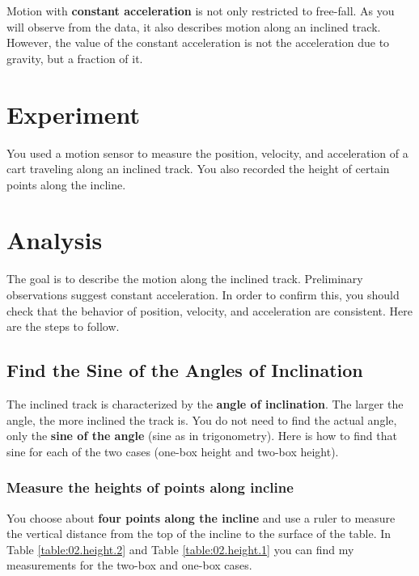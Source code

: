 Motion with \textbf{constant acceleration} is not only restricted to free-fall. As you will observe from the data, it also describes motion along an inclined track. However, the value of the constant acceleration is not the acceleration due to gravity, but a fraction of it.
%
\section{Experiment}
%
You used a motion sensor to measure the position, velocity, and acceleration of a cart traveling along an inclined track. You also recorded the height of certain points along the incline.
%
\section{Analysis}
%
The goal is to describe the motion along the inclined track. Preliminary observations suggest constant acceleration. In order to confirm this, you should check that the behavior of position, velocity, and acceleration are consistent. Here are the steps to follow.
%
\subsection{Find the Sine of the Angles of Inclination}
%
The inclined track is characterized by the \textbf{angle of inclination}. The larger the angle, the more inclined the track is. You do not need to find the actual angle, only the \textbf{sine of the angle} (sine as in trigonometry). Here is how to find that sine for each of the two cases (one-box height and two-box height).
%
\subsubsection{Measure the heights of points along incline}
%
You choose about \textbf{four points along the incline} and use a ruler to measure the vertical distance from the top of the incline to the surface of the table. In Table \ref{table:02.height.2} and Table \ref{table:02.height.1} you can find my measurements for the two-box and one-box cases.
%
